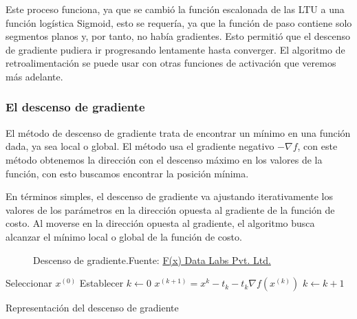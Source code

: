 Este proceso funciona, ya que se cambió la función escalonada de las \gls{LTU} a una función logística Sigmoid, esto se requería, ya que la función de paso contiene solo segmentos planos y, por tanto, no había gradientes. Esto permitió que el descenso de gradiente pudiera ir progresando lentamente hasta converger. El algoritmo de retroalimentación se puede usar con otras funciones de activación que veremos más adelante.


\subsubsection{El descenso de gradiente} \label{sec:gradient-descent}

El método de descenso de gradiente trata de encontrar un mínimo en una función dada, ya sea local o global. El método usa el gradiente negativo ${-\nabla{f}}$, con este método obtenemos la dirección con el descenso máximo en los valores de la función, con esto buscamos encontrar la posición mínima.

En términos simples, el descenso de gradiente va ajustando iterativamente los valores de los parámetros en la dirección opuesta al gradiente de la función de costo. Al moverse en la dirección opuesta al gradiente, el algoritmo busca alcanzar el mínimo local o global de la función de costo.

\begin{figure}[H]
    \centering
    \centerline{}
    \caption{Descenso de gradiente.\newline{}Fuente: \href{https://fxdatalabs.com}{F(x) Data Labs Pvt. Ltd.}}
    \label{fig:gradient-descent}
\end{figure}

\begin{algorithm}[H]
    \SetAlgoLined
    \DontPrintSemicolon
    Seleccionar ${x^{(0)}}$\;
    Establecer ${k \leftarrow 0}$\;
     {
        ${x^{(k+1)} = x^{k} - t_{k} - t_{k} \nabla f(x^{(k)})}$\;
        ${k \leftarrow k + 1}$\;
    }
    \;
    \label{alg:plot-gradient-descent}
    \caption{Representación del descenso de gradiente}
\end{algorithm}

